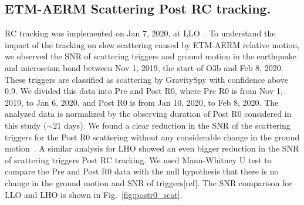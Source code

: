\documentclass[12pt]{iopart}
\begin{document}
\subsection{ETM-AERM Scattering Post RC tracking.}
RC tracking was implemented on Jan 7, 2020, at LLO~\cite{alog_anamaria}. To understand the impact of the tracking on slow scattering caused by ETM-AERM relative motion, we observed the SNR of scattering triggers and ground motion in the earthquake and microseism band between Nov 1, 2019, the start of O3b and Feb 8, 2020. These triggers are classified as scattering by GravitySpy with confidence above 0.9. We divided this data into Pre and Post R0, where Pre R0 is from Nov 1, 2019, to Jan 6, 2020, and Post R0 is from Jan 10, 2020, to Feb 8, 2020. The analyzed data is normalized by the observing duration of Post R0 considered in this study ($\sim 21$ days). We found a clear reduction in the SNR of the scattering triggers for the Post R0 scattering without any considerable change in the ground motion~\cite{alogsid_R0}. A similar analysis for LHO showed an even bigger reduction in the SNR of scattering triggers Post RC tracking. We used Mann-Whitney U test to compare the Pre and Post R0 data with the null hypothesis that there is no change in the ground motion and SNR of triggers[ref]. The SNR comparison for LLO and LHO is shown in Fig.~\ref{fig:postr0_scat}.
\par
\end{document}
